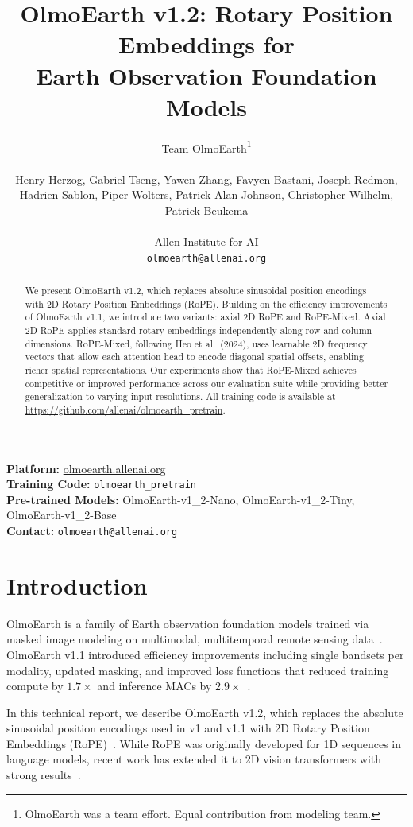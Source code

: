 \documentclass{article}
\title{OlmoEarth v1.2: Rotary Position Embeddings for\\Earth Observation Foundation Models}
\author{
  Team OlmoEarth\thanks{OlmoEarth was a team effort. Equal contribution from modeling team.} \\
  \\
  Henry Herzog, Gabriel Tseng, Yawen Zhang, Favyen Bastani, Joseph Redmon,\\
  Hadrien Sablon, Piper Wolters, Patrick Alan Johnson, Christopher Wilhelm,\\
  Patrick Beukema\\
  \\
  Allen Institute for AI\\
  \texttt{olmoearth@allenai.org}
}
\date{}
\begin{document}
\maketitle

\begin{abstract}
We present OlmoEarth v1.2, which replaces absolute sinusoidal position encodings with 2D Rotary Position Embeddings (RoPE). Building on the efficiency improvements of OlmoEarth v1.1, we introduce two variants: axial 2D RoPE and RoPE-Mixed. Axial 2D RoPE applies standard rotary embeddings independently along row and column dimensions. RoPE-Mixed, following Heo et al.~(2024), uses learnable 2D frequency vectors that allow each attention head to encode diagonal spatial offsets, enabling richer spatial representations. Our experiments show that RoPE-Mixed achieves competitive or improved performance across our evaluation suite while providing better generalization to varying input resolutions. All training code is available at \url{https://github.com/allenai/olmoearth_pretrain}.
\end{abstract}

\vspace{0.5em}
\noindent\textbf{Platform:} \url{olmoearth.allenai.org} \\
\noindent\textbf{Training Code:} \texttt{olmoearth\_pretrain} \\
\noindent\textbf{Pre-trained Models:} OlmoEarth-v1\_2-Nano, OlmoEarth-v1\_2-Tiny, OlmoEarth-v1\_2-Base \\
\noindent\textbf{Contact:} \texttt{olmoearth@allenai.org}

\section{Introduction}

OlmoEarth is a family of Earth observation foundation models trained via masked image modeling on multimodal, multitemporal remote sensing data~\cite{olmoearth}. OlmoEarth v1.1 introduced efficiency improvements including single bandsets per modality, updated masking, and improved loss functions that reduced training compute by $1.7\times$ and inference MACs by $2.9\times$~\cite{olmoearth_v1_1}.

In this technical report, we describe OlmoEarth v1.2, which replaces the absolute sinusoidal position encodings used in v1 and v1.1 with 2D Rotary Position Embeddings (RoPE)~\cite{su2021roformer}. While RoPE was originally developed for 1D sequences in language models, recent work has extended it to 2D vision transformers with strong results~\cite{heo2024rope}.
\end{document}
